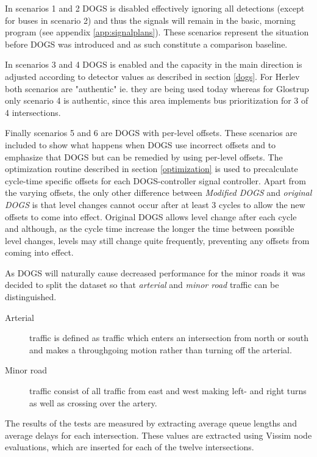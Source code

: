 In scenarios 1 and 2 DOGS is disabled effectively ignoring all detections (except for buses in scenario 2) and thus the signals will remain in the basic, morning program (see appendix \ref{app:signalplans}). These scenarios represent the situation before DOGS was introduced and as such constitute a comparison baseline.

In scenarios 3 and 4 DOGS is enabled and the capacity in the main direction is adjusted according to detector values as described in section \ref{dogs}. For Herlev both scenarios are "authentic" ie. they are being used today whereas for Glostrup only scenario 4 is authentic, since this area implements bus prioritization for 3 of 4 intersections.

Finally scenarios 5 and 6 are DOGS with per-level offsets. These scenarios are included to show what happens when DOGS use incorrect offsets and to emphasize that DOGS but can be remedied by using per-level offsets. 
The optimization routine described in section \ref{optimization} is used to precalculate cycle-time specific offsets for each DOGS-controller signal controller. 
Apart from the varying offsets, the only other difference between \textit{Modified DOGS} and \textit{original DOGS} is that level changes cannot occur after at least 3 cycles to allow the new offsets to come into effect. Original DOGS allows level change after each cycle and although, as the cycle time increase the longer the time between possible level changes, levels may still change quite frequently, preventing any offsets from coming into effect.

As DOGS will naturally cause decreased performance for the minor roads it was decided to split the dataset so that \textit{arterial} and \textit{minor road} traffic can be distinguished. 

\begin{description}
\item[Arterial] traffic is defined as traffic which enters an intersection from north or south and makes a throughgoing motion rather than turning off the arterial. 
\item[Minor road] traffic consist of all traffic from east and west making left- and right turns as well as crossing over the artery.
\end{description}

The results of the tests are measured by extracting average queue lengths and average delays for each intersection. These values are extracted using Vissim node evaluations, which are inserted for each of the twelve intersections.

